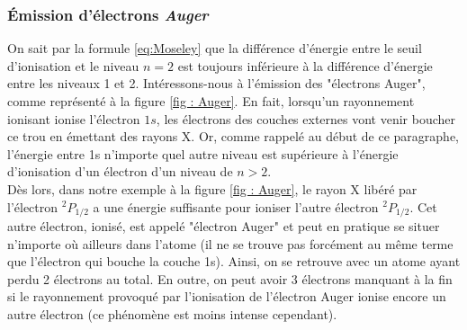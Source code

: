 \subsubsection{Émission d'électrons \emph{Auger}}



On sait par la formule \ref{eq:Moseley} que la différence d'énergie entre le seuil d'ionisation et le niveau $n = 2$ est toujours inférieure à la différence d'énergie entre les niveaux 1 et 2. Intéressons-nous à l'émission des "électrons Auger", comme représenté à la figure \ref{fig : Auger}. En fait, lorsqu'un rayonnement ionisant ionise l'électron $1s$, les électrons des couches externes vont venir boucher ce trou en émettant des rayons X. Or, comme rappelé au début de ce paragraphe, l'énergie entre 1s n'importe quel autre niveau est supérieure à l'énergie d'ionisation d'un électron d'un niveau de $n>2$.\\

Dès lors, dans notre exemple à la figure \ref{fig : Auger}, le rayon X libéré par l'électron $^2P_{1/2}$ a une énergie suffisante pour ioniser l'autre électron $^2P_{1/2}$. Cet autre électron, ionisé, est appelé "électron Auger" et peut en pratique se situer n'importe où ailleurs dans l'atome (il ne se trouve pas forcément au même terme que l'électron qui bouche la couche 1s). Ainsi, on se retrouve avec un atome ayant perdu 2 électrons au total. En outre, on peut avoir 3 électrons manquant à la fin si le rayonnement provoqué par l'ionisation de l'électron Auger ionise encore un autre électron (ce phénomène est moins intense cependant).\\

